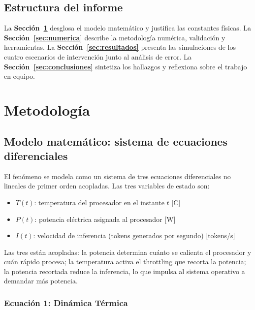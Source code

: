 \documentclass[10pt, twocolumn]{article}
\begin{document}
\subsection{Estructura del informe}

La \textbf{Sección~\ref{sec:metodologia}} desglosa el modelo matemático y justifica
las constantes físicas. La \textbf{Sección~\ref{sec:numerica}} describe la
metodología numérica, validación y herramientas. La
\textbf{Sección~\ref{sec:resultados}} presenta las simulaciones de los cuatro
escenarios de intervención junto al análisis de error. La
\textbf{Sección~\ref{sec:conclusiones}} sintetiza los hallazgos y reflexiona sobre
el trabajo en equipo.

\section{Metodología}
\label{sec:metodologia}

\subsection{Modelo matemático: sistema de ecuaciones diferenciales}

El fenómeno se modela como un sistema de tres ecuaciones diferenciales no lineales
de primer orden acopladas. Las tres variables de estado son:

\begin{itemize}
  \item $T(t)$: temperatura del procesador en el instante $t$ [\textdegree C]
  \item $P(t)$: potencia eléctrica asignada al procesador [W]
  \item $I(t)$: velocidad de inferencia (tokens generados por segundo) [tokens/s]
\end{itemize}

Las tres están acopladas: la potencia determina cuánto se calienta el procesador y
cuán rápido procesa; la temperatura activa el throttling que recorta la potencia;
la potencia recortada reduce la inferencia, lo que impulsa al sistema operativo a
demandar más potencia.

\subsubsection*{Ecuación 1: Dinámica Térmica}
\end{document}
